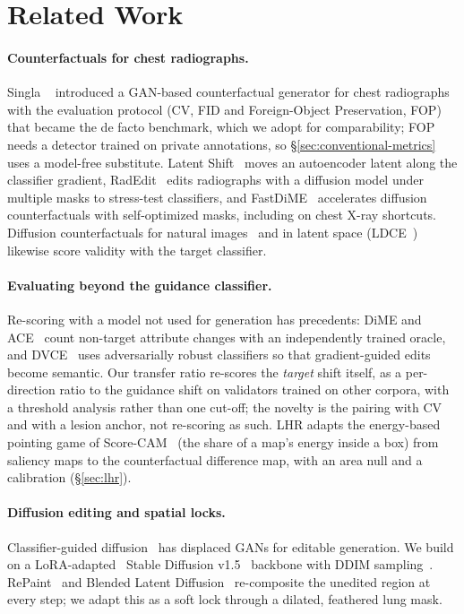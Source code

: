 \section{Related Work}
\label{sec:related}

\paragraph{Counterfactuals for chest radiographs.} Singla \etal~\cite{singla2022explaining} introduced a GAN-based counterfactual generator for chest radiographs with the evaluation protocol (CV, FID and Foreign-Object Preservation, FOP) that became the de facto benchmark, which we adopt for comparability; FOP needs a detector trained on private annotations, so \S\ref{sec:conventional-metrics} uses a model-free substitute. Latent Shift~\cite{cohen2021gifsplanation} moves an autoencoder latent along the classifier gradient, RadEdit~\cite{perezgarcia2024radedit} edits radiographs with a diffusion model under multiple masks to stress-test classifiers, and FastDiME~\cite{weng2024fastdime} accelerates diffusion counterfactuals with self-optimized masks, including on chest X-ray shortcuts. Diffusion counterfactuals for natural images~\cite{augustin2022diffusion,jeanneret2022diffusion,jeanneret2023adversarial} and in latent space (LDCE~\cite{farid2023ldce}) likewise score validity with the target classifier.

\paragraph{Evaluating beyond the guidance classifier.} Re-scoring with a model not used for generation has precedents: DiME and ACE~\cite{jeanneret2022diffusion,jeanneret2023adversarial} count non-target attribute changes with an independently trained oracle, and DVCE~\cite{augustin2022diffusion} uses adversarially robust classifiers so that gradient-guided edits become semantic. Our transfer ratio re-scores the \emph{target} shift itself, as a per-direction ratio to the guidance shift on validators trained on other corpora, with a threshold analysis rather than one cut-off; the novelty is the pairing with CV and with a lesion anchor, not re-scoring as such. LHR adapts the energy-based pointing game of Score-CAM~\cite{wang2020scorecam} (the share of a map's energy inside a box) from saliency maps to the counterfactual difference map, with an area null and a calibration (\S\ref{sec:lhr}).

\paragraph{Diffusion editing and spatial locks.} Classifier-guided diffusion~\cite{dhariwal2021diffusion,meng2022sdedit,preechakul2022diffusion} has displaced GANs for editable generation. We build on a LoRA-adapted~\cite{hu2022lora} Stable Diffusion v1.5~\cite{rombach2022highresolution} backbone with DDIM sampling~\cite{song2021denoising}. RePaint~\cite{lugmayr2022repaint} and Blended Latent Diffusion~\cite{avrahami2022blended} re-composite the unedited region at every step; we adapt this as a soft lock through a dilated, feathered lung mask.

